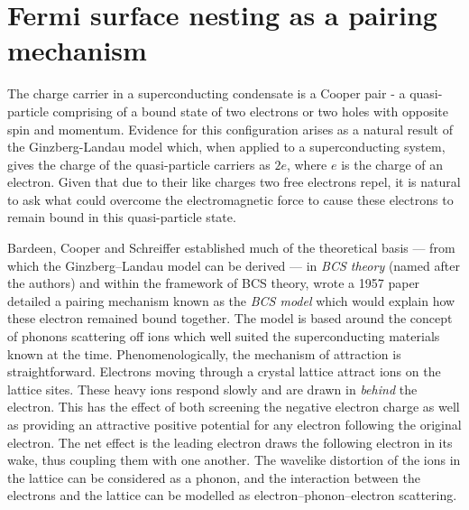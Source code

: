 

\section{Fermi surface nesting as a pairing mechanism}

The charge carrier in a superconducting condensate is a Cooper pair - a quasi-particle comprising of a bound state of two electrons or two holes with opposite spin and momentum. Evidence for this configuration arises as a natural result of the Ginzberg-Landau model which, when applied to a superconducting system, gives the charge of the quasi-particle carriers as $2e$, where $e$ is the charge of an electron. Given that due to their like charges two free electrons repel, it is natural to ask what could overcome the electromagnetic force to cause these electrons to remain bound in this quasi-particle state.

Bardeen, Cooper and Schreiffer established much of the theoretical basis --- from which the Ginzberg--Landau model can be derived --- in \textit{BCS theory} (named after the authors) and within the framework of BCS theory, wrote a 1957 paper\cite{Bardeen1957} detailed a pairing mechanism known as the \textit{BCS model} which would explain how these electron remained bound together. The model is based around the concept of phonons scattering off ions which well suited the superconducting materials known at the time. Phenomenologically, the mechanism of attraction is straightforward. Electrons moving through a crystal lattice attract ions on the lattice sites. These heavy ions respond slowly and are drawn in \textit{behind} the electron. This has the effect of both screening the negative electron charge as well as providing an attractive positive potential for any electron following the original electron. The net effect is the leading electron draws the following electron in its wake, thus coupling them with one another. The wavelike distortion of the ions in the lattice can be considered as a phonon, and the interaction between the electrons and the lattice can be modelled as electron--phonon--electron scattering.

